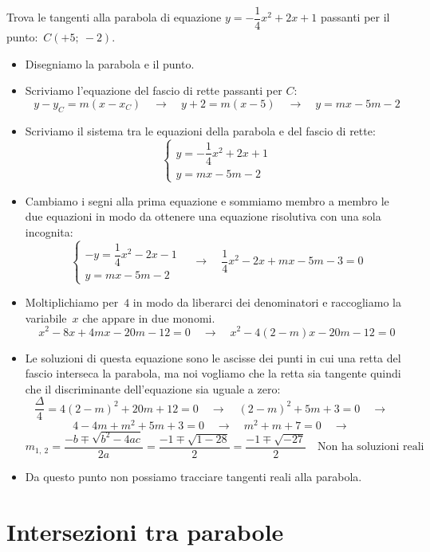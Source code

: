 \begin{esempio}
 Trova le tangenti alla parabola di equazione \(y=-\dfrac{1}{4}x^2+2x +1\)
 passanti per il punto:~\(C(+5;~-2)\).

 \begin{itemize}
  \item Disegniamo la parabola e il punto.
  \item Scriviamo l'equazione del fascio di rette passanti per \(C\):
\[y-y_C = m(x-x_C) \quad \rightarrow \quad
y+2 = m\left(x-5\right)
\quad \rightarrow \quad y=mx-5m-2\]
  \item Scriviamo il sistema tra le equazioni della parabola e del fascio di
   rette:
\[\left\{\begin{array}{l}
  y=-\dfrac{1}{4}x^2+2x +1\\
  y=mx-5m-2
\end{array}\right. \]
  \item Cambiamo i segni alla prima equazione e sommiamo membro a membro le
   due equazioni in modo da ottenere una equazione risolutiva con una sola
   incognita:
\[\left\{\begin{array}{l}
  -y=\dfrac{1}{4}x^2-2x-1\\
  y=mx-5m-2
\end{array}\right. \quad \rightarrow \quad
\dfrac{1}{4}x^2-2x+mx-5m-3=0\]
  \item Moltiplichiamo per~\(4\) in modo da liberarci dei denominatori e
   raccogliamo la variabile~\(x\) che appare in due monomi.
\[x^2-8x+4mx-20m-12=0 \quad \rightarrow \quad x^2-4(2-m)x-20m-12=0\]
  \item Le soluzioni di questa equazione sono le ascisse dei punti in cui una
   retta del fascio interseca la parabola, ma noi vogliamo che la retta sia
   tangente quindi che il discriminante dell'equazione sia uguale a zero:
\[\dfrac{\Delta}{4}=4(2-m)^2+20m+12=0 \quad \rightarrow \quad
(2-m)^2+5m+3=0 \quad \rightarrow \quad\]
\[4-4m+m^2+5m+3=0 \quad \rightarrow \quad
m^2+m+7=0 \quad \rightarrow \quad\]
\[m_{1,~2}=\dfrac{-b \mp \sqrt{b^2-4ac}}{2a}=\dfrac{-1 \mp \sqrt{1-28}}{2}=
\dfrac{-1 \mp \sqrt{-27}}{2} \quad \text{Non ha soluzioni reali}\]
  \item Da questo punto non possiamo tracciare tangenti reali alla
   parabola.
 \end{itemize}
\end{esempio}


\section{Intersezioni tra parabole}
\label{sec:parabola_intersezioniparabole}

